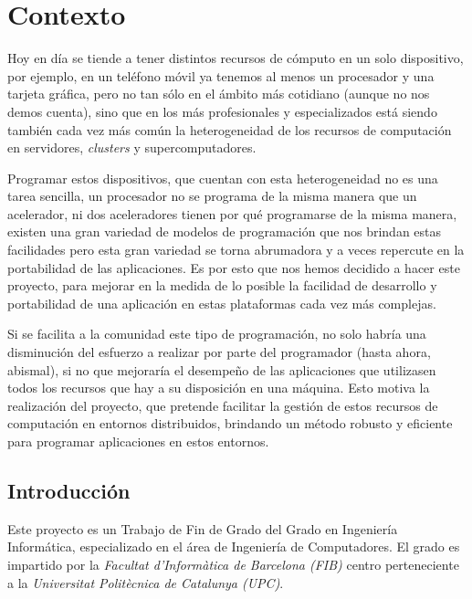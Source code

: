 \section{Contexto}

Hoy en día se tiende a tener distintos recursos de cómputo en un solo dispositivo, por ejemplo, en un teléfono móvil ya tenemos al menos un procesador y una tarjeta gráfica, pero no tan sólo en el ámbito más cotidiano (aunque no nos demos cuenta), sino que en los más profesionales y especializados está siendo también cada vez más común la heterogeneidad de los recursos de computación en servidores, \textit{clusters} y supercomputadores. 
\par\bigskip
Programar estos dispositivos, que cuentan con esta heterogeneidad no es una tarea sencilla, un procesador no se programa de la misma manera que un acelerador, ni dos aceleradores tienen por qué programarse de la misma manera, existen una gran variedad de modelos de programación que nos brindan estas facilidades pero esta gran variedad se torna abrumadora y a veces repercute en la portabilidad de las aplicaciones. Es por esto que nos hemos decidido a hacer este proyecto, para mejorar en la medida de lo posible la facilidad de desarrollo y portabilidad de una aplicación en estas plataformas cada vez más complejas.
\par\bigskip
Si se facilita a la comunidad este tipo de programación, no solo habría una disminución del esfuerzo a realizar por parte del programador (hasta ahora, abismal), si no que mejoraría el desempeño de las aplicaciones que utilizasen todos los recursos que hay a su disposición en una máquina. Esto motiva la realización del proyecto, que pretende facilitar la gestión de estos recursos de computación en entornos distribuidos, brindando un método robusto y eficiente para programar aplicaciones en estos entornos.

\subsection{Introducción}

Este proyecto es un Trabajo de Fin de Grado del Grado en Ingeniería Informática, especializado en el área de Ingeniería de Computadores. El grado es impartido por la \textit{Facultat d'Informàtica de Barcelona (FIB)} centro perteneciente a la \textit{Universitat Politècnica de Catalunya (UPC)}. 
\par\bigskip


